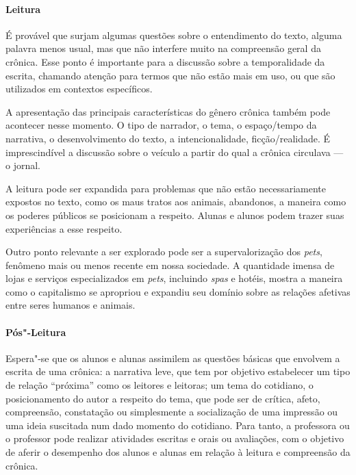 \documentclass[11pt]{extarticle}
\begin{document}
\paragraph{Leitura}

É provável que surjam algumas questões sobre o entendimento do texto,
alguma palavra menos usual, mas que não interfere muito na compreensão
geral da crônica. Esse ponto é importante para a discussão sobre a
temporalidade da escrita, chamando atenção para termos que não estão
mais em uso, ou que são utilizados em contextos específicos.

A apresentação das principais características do gênero crônica também
pode acontecer nesse momento. O tipo de narrador, o tema, o espaço/tempo
da narrativa, o desenvolvimento do texto, a intencionalidade,
ficção/realidade. É imprescindível a discussão sobre o veículo a partir
do qual a crônica circulava --- o jornal.

A leitura pode ser expandida para problemas que não estão
necessariamente expostos no texto, como os maus tratos aos animais,
abandonos, a maneira como os poderes públicos se posicionam a respeito.
Alunas e alunos podem trazer suas experiências a esse respeito.

Outro ponto relevante a ser explorado pode ser a supervalorização dos
\emph{pets}, fenômeno mais ou menos recente em nossa sociedade. A
quantidade imensa de lojas e serviços especializados em \emph{pets},
incluindo \emph{spas} e hotéis, mostra a maneira como o capitalismo se
apropriou e expandiu seu domínio sobre as relações afetivas entre seres
humanos e animais.

{\paragraph{Pós"-Leitura}}

Espera"-se que os alunos e alunas assimilem as questões básicas que
envolvem a escrita de uma crônica: a narrativa leve, que tem por
objetivo estabelecer um tipo de relação ``próxima'' como os leitores e
leitoras; um tema do cotidiano, o posicionamento do autor a respeito do
tema, que pode ser de crítica, afeto, compreensão, constatação ou
simplesmente a socialização de uma impressão ou uma ideia suscitada num
dado momento do cotidiano. Para tanto, a professora ou o professor pode
realizar atividades escritas e orais ou avaliações, com o objetivo de
aferir o desempenho dos alunos e alunas em relação à leitura e
compreensão da crônica. 
\end{document}

